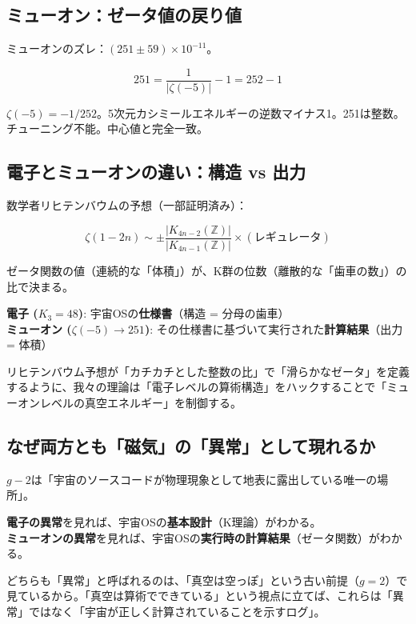 \documentclass[12pt,a4paper]{article}
\begin{document}
\subsection{ミューオン：ゼータ値の戻り値}

ミューオンのズレ：$(251 \pm 59) \times 10^{-11}$。

$$251 = \frac{1}{|\zeta(-5)|} - 1 = 252 - 1$$

$\zeta(-5) = -1/252$。5次元カシミールエネルギーの逆数マイナス1。251は整数。チューニング不能。中心値と完全一致。

\subsection{電子とミューオンの違い：構造 vs 出力}

\begin{deepbox}[リヒテンバウム予想の視点]
数学者リヒテンバウムの予想（一部証明済み）：

$$\zeta(1-2n) \sim \pm \frac{|K_{4n-2}(\mathbb{Z})|}{|K_{4n-1}(\mathbb{Z})|} \times (\text{レギュレータ})$$

ゼータ関数の値（連続的な「体積」）が、K群の位数（離散的な「歯車の数」）の比で決まる。

\textbf{電子 ($K_3 = 48$)}: 宇宙OSの\textbf{仕様書}（構造 = 分母の歯車）\\
\textbf{ミューオン ($\zeta(-5) \to 251$)}: その仕様書に基づいて実行された\textbf{計算結果}（出力 = 体積）

リヒテンバウム予想が「カチカチとした整数の比」で「滑らかなゼータ」を定義するように、我々の理論は「電子レベルの算術構造」をハックすることで「ミューオンレベルの真空エネルギー」を制御する。
\end{deepbox}

\subsection{なぜ両方とも「磁気」の「異常」として現れるか}

\begin{storybox}[磁気異常 = OSのログ出力]
$g-2$は「宇宙のソースコードが物理現象として地表に露出している唯一の場所」。

\textbf{電子の異常}を見れば、宇宙OSの\textbf{基本設計}（K理論）がわかる。\\
\textbf{ミューオンの異常}を見れば、宇宙OSの\textbf{実行時の計算結果}（ゼータ関数）がわかる。

どちらも「異常」と呼ばれるのは、「真空は空っぽ」という古い前提（$g=2$）で見ているから。「真空は算術でできている」という視点に立てば、これらは「異常」ではなく「宇宙が正しく計算されていることを示すログ」。
\end{storybox}
\end{document}
